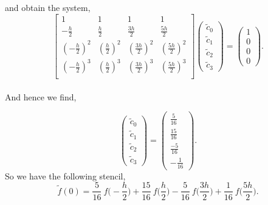 \documentclass[paper=a4, fontsize=11pt]{scrartcl} %
\numberwithin{equation}{section} %
\numberwithin{figure}{section} %
\numberwithin{table}{section} %
\begin{document}
and obtain the system,\\

$$\left[ \begin{array}{cccc}
1                           &                 1                   &             1                 &                 1              \\
-\frac{h}{2}         &        \frac{h}{2}            &     \frac{3h}{2}         &       \frac{5h}{2}        \\
(-\frac{h}{2})^2  &        (\frac{h}{2})^2     &     (\frac{3h}{2})^2    &       (\frac{5h}{2})^2  \\
(-\frac{h}{2})^3  &        (\frac{h}{2})^3     &     (\frac{3h}{2})^3    &       (\frac{5h}{2})^3  \\
\end{array} \right] %
%
\left( \begin{array}{c}
\tilde{c}_{0} \\
\tilde{c}_{1} \\
\tilde{c}_2 \\
\tilde{c}_3 
\end{array} \right) =  
%
\left( \begin{array}{c}
1 \\
0 \\
0 \\
0
\end{array} \right).$$\\

And hence we find, 

$$\left( \begin{array}{c}
\tilde{c}_{0} \\
\tilde{c}_{1} \\
\tilde{c}_2 \\
\tilde{c}_3 
\end{array} \right) = \left( \begin{array}{c}
\frac{5}{16} \\
\frac{15}{16}  \\
\frac{-5}{16}  \\
-\frac{1}{16} 
\end{array} \right).$$ $ $\\ 

So we have the following stencil,\\

$$\tilde{f}(0) = \frac{5}{16}\ f\Big(-\frac{h}{2}\Big) + \frac{15}{16}\ f\Big(\frac{h}{2}\Big) - \frac{5}{16}\ f\Big(\frac{3h}{2}\Big) + \frac{1}{16}\ f\Big(\frac{5h}{2}\Big).$$
\end{document}
